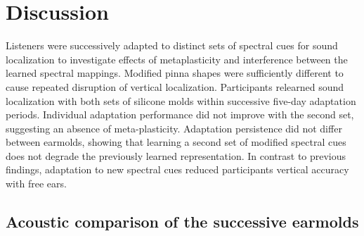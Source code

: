 \section{Discussion}\label{sec1}%

Listeners were successively adapted to distinct sets of spectral cues for sound localization to investigate effects of metaplasticity and interference between the learned spectral mappings. Modified pinna shapes were sufficiently different to cause repeated disruption of vertical localization. Participants relearned sound localization with both sets of silicone molds within successive five-day adaptation periods. Individual adaptation performance did not improve with the second set, suggesting an absence of meta-plasticity. Adaptation persistence did not differ between earmolds, showing that learning a second set of modified spectral cues does not degrade the previously learned representation. In contrast to previous findings, adaptation to new spectral cues reduced participants vertical accuracy with free ears.

\subsection{Acoustic comparison of the successive earmolds}

